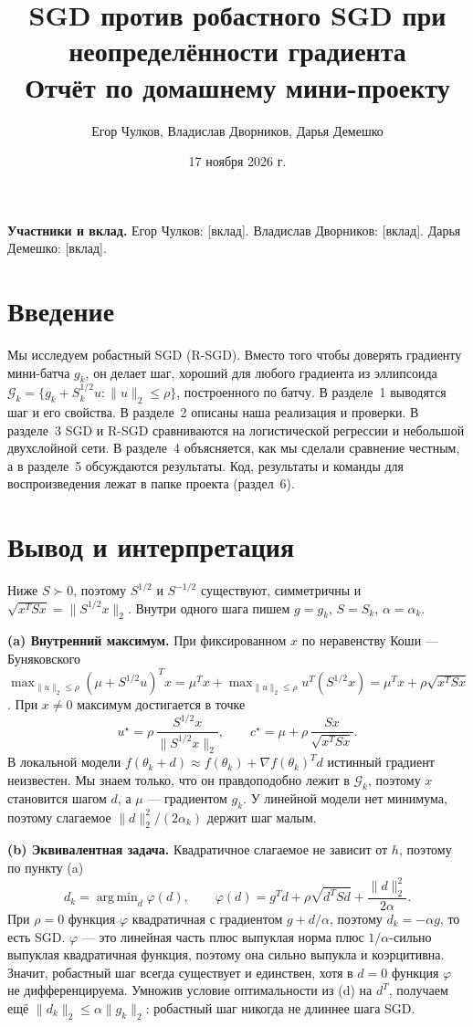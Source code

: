 \documentclass[11pt,a4paper]{article}
\title{SGD против робастного SGD при неопределённости градиента\\[0.2em]\large Отчёт по домашнему мини-проекту}
\author{Егор Чулков, Владислав Дворников, Дарья Демешко}
\date{17 ноября 2026 г.}
\newcommand{\G}{\mathcal{G}_k}
\newcommand{\norm}[1]{\lVert #1\rVert_2}
\DeclareMathOperator*{\argmin}{arg\,min}
\begin{document}
\maketitle

\noindent\textbf{Участники и вклад.}
Егор Чулков: [вклад].
Владислав Дворников: [вклад].
Дарья Демешко: [вклад].

\section*{Введение}

Мы исследуем робастный SGD (R-SGD). Вместо того чтобы доверять градиенту мини-батча $g_k$, он
делает шаг, хороший для любого градиента из эллипсоида $\G=\{g_k+S_k^{1/2}u:\norm u\le\rho\}$,
построенного по батчу. В разделе~1 выводятся шаг и его свойства. В разделе~2 описаны наша
реализация и проверки. В разделе~3 SGD и R-SGD сравниваются на логистической регрессии и небольшой
двухслойной сети. В разделе~4 объясняется, как мы сделали сравнение честным, а в разделе~5 обсуждаются
результаты. Код, результаты и команды для воспроизведения лежат в папке проекта (раздел~6).

\section{Вывод и интерпретация}

Ниже $S\succ0$, поэтому $S^{1/2}$ и $S^{-1/2}$ существуют, симметричны и $\sqrt{x^TSx}=\norm{S^{1/2}x}$.
Внутри одного шага пишем $g=g_k$, $S=S_k$, $\alpha=\alpha_k$.

\textbf{(a) Внутренний максимум.} При фиксированном $x$ по неравенству Коши — Буняковского
$\max_{\norm u\le\rho}(\mu+S^{1/2}u)^Tx=\mu^Tx+\max_{\norm u\le\rho}u^T(S^{1/2}x)=\mu^Tx+\rho\sqrt{x^TSx}$.
При $x\ne0$ максимум достигается в точке
\begin{equation*}
u^\star=\rho\,\frac{S^{1/2}x}{\norm{S^{1/2}x}},\qquad c^\star=\mu+\rho\,\frac{Sx}{\sqrt{x^TSx}} .
\end{equation*}
В локальной модели $f(\theta_k+d)\approx f(\theta_k)+\nabla f(\theta_k)^Td$ истинный градиент неизвестен.
Мы знаем только, что он правдоподобно лежит в $\G$, поэтому $x$ становится шагом $d$, а $\mu$ —
градиентом $g_k$. У линейной модели нет минимума, поэтому слагаемое $\norm d^2/(2\alpha_k)$ держит шаг
малым.

\textbf{(b) Эквивалентная задача.} Квадратичное слагаемое не зависит от $h$, поэтому по пункту (a)
\begin{equation*}
d_k=\argmin_d\varphi(d),\qquad \varphi(d)=g^Td+\rho\sqrt{d^TSd}+\frac{\norm d^2}{2\alpha}. \tag{2}
\end{equation*}
При $\rho=0$ функция $\varphi$ квадратичная с градиентом $g+d/\alpha$, поэтому $d_k=-\alpha g$, то
есть SGD. $\varphi$ — это линейная часть плюс выпуклая норма плюс $1/\alpha$-сильно выпуклая
квадратичная функция, поэтому она сильно выпукла и коэрцитивна. Значит, робастный шаг всегда
существует и единствен, хотя в $d=0$ функция $\varphi$ не дифференцируема. Умножив условие
оптимальности из (d) на $d^T$, получаем ещё $\norm{d_k}\le\alpha\norm{g_k}$: робастный шаг никогда не
длиннее шага SGD.
\end{document}

